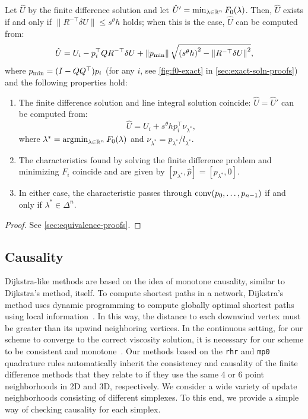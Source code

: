 \documentclass[sisc-eikonal.tex]{subfiles}
\begin{document}
\begin{theorem}\label{thm:equivalence}
  Let $\hat{U}$ by the finite difference solution and let
  $\hat{U}' = \min_{\lambda \in \mathbb{R}^n} F_0(\lambda)$. Then, $\hat{U}$
  exists if and only if $\|R^{-\top} \delta U\| \leq s^\theta h$
  holds; when this is the case, $\hat{U}$ can be computed from:
  \begin{equation}
    \label{eq:U-finite-diff}
    \hat{U} = U_i - p_i^\top Q R^{-\top} \delta U + \norm{\pmin} \sqrt{{(s^\theta h)}^2 - \norm{R^{-\top} \delta U}^2},
  \end{equation}
  where $p_{\operatorname{min}} = (I - QQ^\top) p_i$ (for any $i$, see
  \cref{fig:f0-exact} in \cref{sec:exact-soln-proofs}) and the
  following properties hold:
  \begin{enumerate}
  \item The finite difference solution and line integral solution
    coincide: $\hat{U} = \hat{U}'$ can be computed from:
    \begin{equation}
      \label{eq:U-from-Ui-exact}
      \hat{U} = U_i + s^\theta h p_i^\top \nu_{\lambda^*},
    \end{equation}
    where $\lambda^* = \operatorname{argmin}_{\lambda \in \mathbb{R}^n} F_0(\lambda)$ and
    $\nu_{\lambda^*} = p_{\lambda^*}/l_{\lambda^*}$.
  \item The characteristics found by solving the finite difference
    problem and minimizing $F_i$ coincide and are given by
    $[p_{\lambda^*}, \hat{p}] = [p_{\lambda^*}, 0]$.
  \item In either case, the characteristic passes through
    $\operatorname{conv}(p_0, \hdots, p_{n-1})$ if and only if
    $\lambda^* \in \Delta^n$.
  \end{enumerate}
\end{theorem}

\begin{proof}
  See \cref{sec:equivalence-proofs}.
\end{proof}

\subsection{Causality}\label{ssec:causality} Dijkstra-like
methods are based on the idea of monotone causality, similar to
Dijkstra's method, itself. To compute shortest paths in a network,
Dijkstra's method uses dynamic programming to compute globally optimal
shortest paths using local information~\cite{dijkstra1959note}. In
this way, the distance to each downwind vertex must be greater than
its upwind neighboring vertices. In the continuous setting, for our
scheme to converge to the correct viscosity solution, it is necessary
for our scheme to be consistent and
monotone~\cite{crandall1983viscosity}. Our methods based on the
\texttt{rhr} and \texttt{mp0} quadrature rules automatically inherit
the consistency and causality of the finite difference methods that
they relate to if they use the same 4 or 6 point neighborhoods in 2D
and 3D, respectively. We consider a wide variety of update
neighborhoods consisting of different simplexes. To this end, we
provide a simple way of checking causality for each simplex.
\end{document}
